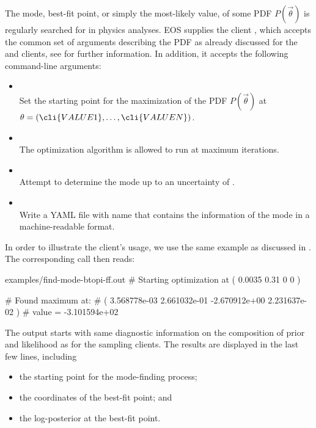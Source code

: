 The mode, best-fit point, or simply the most-likely value, of some \gls{PDF}
$P(\vec\theta)$ is regularly searched for in physics analyses. EOS supplies the
client , which accepts the common set of arguments
describing the PDF as already discussed for the  and
 clients, see  for
further information.  In addition, it accepts the following command-line
arguments:
\begin{itemize}
    \item[] \\[\medskipamount]
        Set the starting point for the maximization of the PDF $P(\vec\theta)$
        at $\theta = ( \cli{VALUE1}, \dots, \cli{VALUEN} )$.
    \item[] \\[\medskipamount]
        The optimization algorithm is allowed to run at maximum  iterations.
    \item[] \\[\medskipamount]
        Attempt to determine the mode up to an uncertainty of .
    \item[] \\[\medskipamount]
        Write a YAML file with name  that contains the information of
        the mode in a machine-readable format.
\end{itemize}

In order to illustrate the client's usage, we use the same example as
discussed in . The corresponding call
then reads:

\begin{filecontents*}{examples/find-mode-btopi-ff.out}
# Starting optimization at ( 0.0035 0.31 0 0 )

# Found maximum at:
#   ( 3.568778e-03 2.661032e-01 -2.670912e+00 2.231637e-02 )
#   value = -3.101594e+02
\end{filecontents*}
The output starts with same diagnostic information on the composition of
prior and likelihood as for the sampling clients. The results are displayed
in the last few lines, including
\begin{itemize}
    \item the starting point for the mode-finding process;
    \item the coordinates of the best-fit point; and
    \item the log-posterior at the best-fit point.
\end{itemize}

